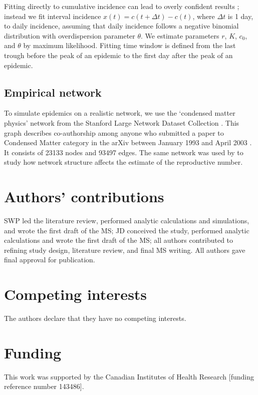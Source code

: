 \documentclass[12pt]{article}
\begin{document}
Fitting directly to cumulative incidence can lead to overly confident results \citep{king2015avoidable}; instead we fit interval incidence $x(t) = c(t + \Delta t) - c(t)$, where $\Delta t$ is 1 day, to daily incidence, assuming that daily incidence follows a negative binomial distribution with overdispersion parameter $\theta$.
We estimate parameters $r$, $K$, $c_0$, and $\theta$ by maximum likelihood.
Fitting time window is defined from the last trough before the peak of an epidemic to the first day after the peak of an epidemic.

\subsection{Empirical network}

To simulate epidemics on a realistic network, we use the `condensed matter physics' network from the Stanford Large Network Dataset Collection \citep{leskovec2016snap}.
This graph describes co-authorship among anyone who submitted a paper to Condensed Matter category in the arXiv between January 1993 and April 2003 \citep{leskovec2007graph}.
It consists of 23133 nodes and 93497 edges.
The same network was used by \cite{trapman2016inferring} to study how network structure affects the estimate of the reproductive number.

\section*{Authors' contributions}

SWP led the literature review, performed analytic calculations and simulations, and wrote the first draft of the MS; JD conceived the study, performed analytic calculations and wrote the first draft of the MS; all authors contributed to refining study design, literature review, and final MS writing. All authors gave final approval for publication. 

\section*{Competing interests}

The authors declare that they have no competing interests.

\section*{Funding}

This work was supported by the Canadian Institutes of Health Research [funding reference number 143486].

\pagebreak


\end{document}
